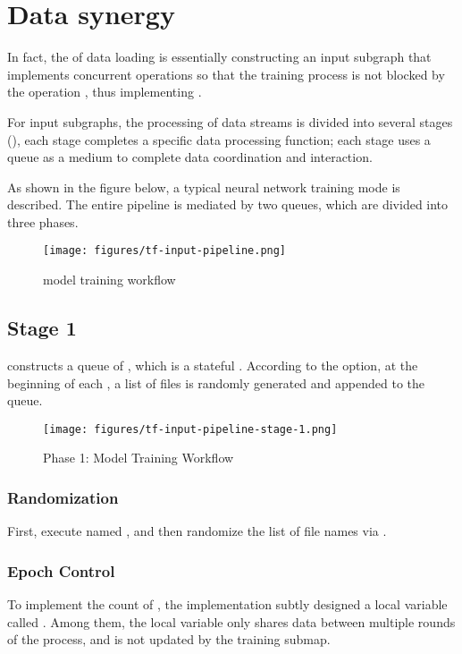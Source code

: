 \section{Data synergy}
\begin{content}
In fact, the  of data loading is essentially constructing an input subgraph that implements concurrent  operations so that the training process is not blocked by the operation , thus implementing .

For input subgraphs, the processing of data streams is divided into several stages (), each stage completes a specific data processing function; each stage uses a queue as a medium to complete data coordination and interaction.

As shown in the figure below, a typical neural network training mode is described. The entire pipeline is mediated by two queues, which are divided into three phases.

\begin{figure}[!htbp]
  \centering
  \texttt{[image: figures/tf-input-pipeline.png]}
  \caption{model training workflow}
  \label{fig:tf-input-pipeline}
\end{figure}


\subsection{Stage 1}
 constructs a queue of , which is a stateful . According to the  option, at the beginning of each , a list of files is randomly generated and appended to the queue.

\begin{figure}[!htbp]
  \centering
  \texttt{[image: figures/tf-input-pipeline-stage-1.png]}
  \caption{Phase 1: Model Training Workflow}
  \label{fig:tf-input-pipeline-stage-1}
\end{figure}


\subsubsection{Randomization}
First, execute  named , and then randomize the list of file names via .


\subsubsection{Epoch Control}
To implement the count of , the implementation subtly designed a local variable called . Among them, the local variable only shares data between multiple rounds of the process, and is not updated by the training submap.


\end{content}

